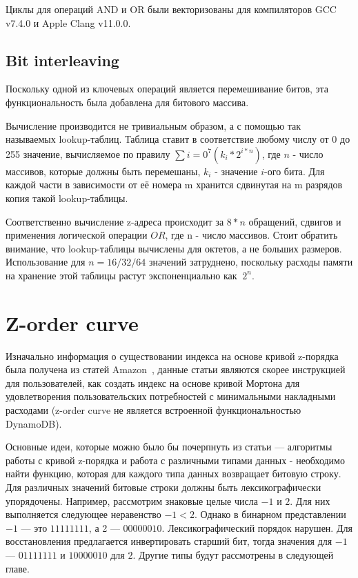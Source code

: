 Циклы для операций AND и OR были векторизованы для компиляторов
GCC v7.4.0 и Apple Clang v11.0.0.

\subsection{Bit interleaving}
Поскольку одной из ключевых операций является перемешивание битов, эта функциональность была добавлена для битового массива.

Вычисление производится не тривиальным образом, а с помощью так называемых lookup-таблиц. Таблица ставит в соответствие любому числу от 0 до 255 значение, вычисляемое по правилу $\sum{i=0}^7(k_i * 2^{i*n})$, где $n$ - число массивов, которые должны быть перемешаны, $k_i$ - значение $i$-ого бита. Для каждой части в зависимости от её номера m хранится сдвинутая на m разрядов копия такой lookup-таблицы.

Соответственно вычисление z-адреса происходит за $8*n$ обращений, сдвигов и применения логической операции $OR$, где n - число массивов. Стоит обратить внимание, что lookup-таблицы вычислены для октетов, а не больших размеров. Использование для $n=16/32/64$ значений затруднено, поскольку расходы памяти на хранение этой таблицы растут экспоненциально как $~2^n$.


\section{Z-order curve}
Изначально информация о существовании индекса на основе кривой z-порядка была получена из статей Amazon~\cite{DynamoZorderP1, DynamoZorderP2}, данные статьи являются скорее инструкцией для пользователей, как создать индекс на основе кривой Мортона для удовлетворения пользовательских потребностей с минимальными накладными расходами (z-order curve не является встроенной функциональностью DynamoDB).

Основные идеи, которые можно было бы почерпнуть из статьи --- алгоритмы работы с кривой z-порядка и работа с различными типами данных - необходимо найти функцию, которая для каждого типа данных возвращает битовую строку. Для различных значений битовые строки должны быть лексикографически упорядочены. Например, рассмотрим знаковые целые числа $-1$ и $2$. Для них выполняется следующее неравенство $-1 < 2$. Однако в бинарном представлении $-1$ --- это $11111111$, а 2 --- $00000010$. Лексикографический порядок нарушен. Для восстановления предлагается инвертировать старший бит, тогда значения для $-1$ --- $01111111$ и $10000010$ для $2$. Другие типы будут рассмотрены в следующей главе.

